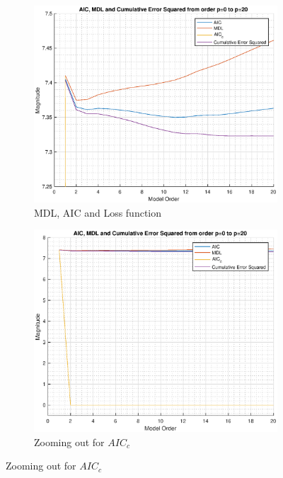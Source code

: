 \documentclass{article}
\begin{document}
\begin{figure}[h!]
\centering
\begin{subfigure}{0.32\textwidth}
\centering
\includegraphics[width = \textwidth]{heart_mdl_t1_zoom}
\caption{MDL, AIC and Loss function}
\label{fig:heart_mdl_t1_zoom}
\end{subfigure}
\begin{subfigure}{0.32\textwidth}
\centering
\includegraphics[width = \textwidth]{heart_mdl_t1}
\caption{Zooming out for $AIC_c$}
\label{fig:heart_mdl_t1}
\end{subfigure}

\end{figure}
\end{document}
